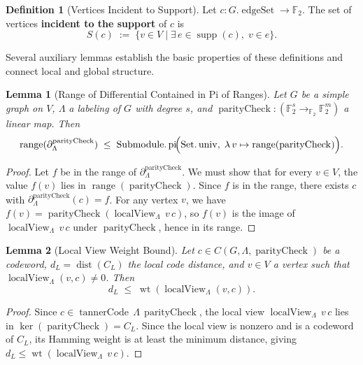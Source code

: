 \documentclass[11pt]{article}
\theoremstyle{plain}
\newtheorem*{lemma}{Lemma}
\theoremstyle{definition}
\newtheorem*{definition}{Definition}
\theoremstyle{remark}
\renewcommand{\ker}{\operatorname{ker}}
\begin{document}
\begin{definition}[Vertices Incident to Support]
Let $c : G.\operatorname{edgeSet} \to \mathbb{F}_2$. The set of vertices \textbf{incident to the support} of $c$ is
\[
S(c) \;:=\; \{v \in V \mid \exists\, e \in \operatorname{supp}(c),\; v \in e\}.
\]
\end{definition}

Several auxiliary lemmas establish the basic properties of these definitions and connect local and global structure.

\begin{lemma}[Range of Differential Contained in Pi of Ranges]
Let $G$ be a simple graph on $V$, $\Lambda$ a labeling of $G$ with degree $s$, and $\operatorname{parityCheck} : (\mathbb{F}_2^s \to_{\mathbb{F}_2} \mathbb{F}_2^m)$ a linear map. Then
\[
\operatorname{range}(\partial_\Lambda^{\operatorname{parityCheck}}) \;\leq\; \operatorname{Submodule.pi}\!\Bigl(\operatorname{Set.univ},\;\lambda\,v \mapsto \operatorname{range}(\operatorname{parityCheck})\Bigr).
\]
\end{lemma}

\begin{proof}
Let $f$ be in the range of $\partial_\Lambda^{\operatorname{parityCheck}}$. We must show that for every $v \in V$, the value $f(v)$ lies in $\operatorname{range}(\operatorname{parityCheck})$. Since $f$ is in the range, there exists $c$ with $\partial_\Lambda^{\operatorname{parityCheck}}(c) = f$. For any vertex $v$, we have $f(v) = \operatorname{parityCheck}(\operatorname{localView}_\Lambda\,v\,c)$, so $f(v)$ is the image of $\operatorname{localView}_\Lambda\,v\,c$ under $\operatorname{parityCheck}$, hence in its range.
\end{proof}

\begin{lemma}[Local View Weight Bound]
Let $c \in C(G, \Lambda, \operatorname{parityCheck})$ be a codeword, $d_L = \operatorname{dist}(C_L)$ the local code distance, and $v \in V$ a vertex such that $\operatorname{localView}_\Lambda(v, c) \neq 0$. Then
\[
d_L \;\leq\; \operatorname{wt}(\operatorname{localView}_\Lambda(v,c)).
\]
\end{lemma}

\begin{proof}
Since $c \in \operatorname{tannerCode}\,\Lambda\,\operatorname{parityCheck}$, the local view $\operatorname{localView}_\Lambda\,v\,c$ lies in $\ker(\operatorname{parityCheck}) = C_L$. Since the local view is nonzero and is a codeword of $C_L$, its Hamming weight is at least the minimum distance, giving $d_L \leq \operatorname{wt}(\operatorname{localView}_\Lambda\,v\,c)$.
\end{proof}
\end{document}
